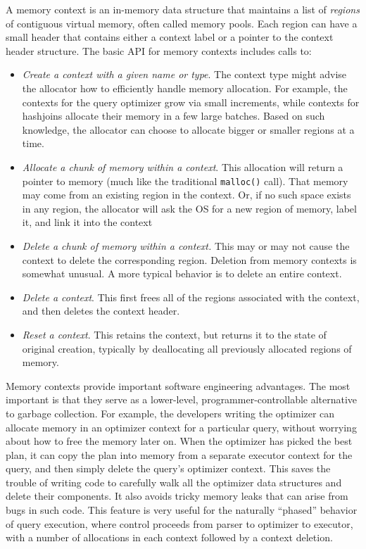 \documentclass[b5paper,11pt,twoside,openright]{book}
\begin{document}
A memory context is an in-memory data structure that maintains a list of
\emph{regions} of contiguous virtual memory, often called memory pools.
Each region can have a small header that contains either a context label
or a pointer to the context header structure. The basic API for memory
contexts includes calls to:

\begin{itemize}

\item
  \emph{Create a context with a given name or type}. The context type
  might advise the allocator how to efficiently handle memory
  allocation. For example, the contexts for the query optimizer grow via
  small increments, while contexts for hashjoins allocate their memory
  in a few large batches. Based on such knowledge, the allocator can
  choose to allocate bigger or smaller regions at a time.
\end{itemize}

\begin{itemize}
\item
  \emph{Allocate a chunk of memory within a context}. This allocation
  will return a pointer to memory (much like the traditional \texttt{malloc()}
  call). That memory may come from an existing region in the context.
  Or, if no such space exists in any region, the allocator will ask the
  OS for a new region of memory, label it, and link it into the context
\item
  \emph{Delete a chunk of memory within a context.} This may or may not
  cause the context to delete the corresponding region. Deletion from
  memory contexts is somewhat unusual. A more typical behavior is to
  delete an entire context.
\item
  \emph{Delete a context}. This first frees all of the regions
  associated with the context, and then deletes the context header.
\item
  \emph{Reset a context}. This retains the context, but returns it to
  the state of original creation, typically by deallocating all
  previously allocated regions of memory.
\end{itemize}

Memory contexts provide important software engineering advantages. The
most important is that they serve as a lower-level,
programmer-controllable alternative to garbage collection. For example,
the developers writing the optimizer can allocate memory in an optimizer
context for a particular query, without worrying about how to free the
memory later on. When the optimizer has picked the best plan, it can
copy the plan into memory from a separate executor context for the
query, and then simply delete the query's optimizer context. This saves
the trouble of writing code to carefully walk all the optimizer data
structures and delete their components. It also avoids tricky memory
leaks that can arise from bugs in such code. This feature is very useful
for the naturally ``phased'' behavior of query execution, where control
proceeds from parser to optimizer to executor, with a number of
allocations in each context followed by a context deletion.
\end{document}
